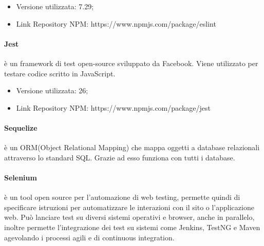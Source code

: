 \documentclass[../manuale_sviluppatore.tex]{subfiles}
\begin{document}
\begin{itemize}
    \item Versione utilizzata: 7.29;
    \item Link Repository NPM: https://www.npmjs.com/package/eslint 
\end{itemize}

\paragraph{Jest}
 è un framework di test open-source sviluppato da Facebook. Viene utilizzato per testare codice scritto in JavaScript. 
\begin{itemize}
    \item Versione utilizzata: 26;
    \item Link Repository NPM: https://www.npmjs.com/package/jest 
\end{itemize}

\paragraph{Sequelize}
 è un ORM(Object Relational Mapping) che mappa oggetti a database relazionali attraverso lo standard SQL. Grazie ad esso funziona con tutti i database.

\paragraph{Selenium}
 è un tool open source per l'automazione di web testing, permette quindi di specificare istruzioni per automatizzare le interazioni con il sito o l’applicazione web. 
Può lanciare test su diversi sistemi operativi e browser, anche in parallelo, inoltre permette l’integrazione dei test su sistemi come Jenkins, TestNG e Maven agevolando i processi agili e di continuous integration.
\end{document}
